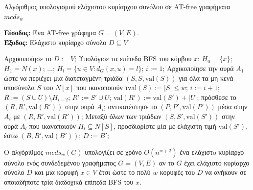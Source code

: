 \begin{algorithm}[H]
	\caption{Αλγόριθμος υπολογισμού ελάχιστου κυρίαρχου συνόλου σε AT-free γραφήματα $mcds_w$}
	\label{alg:domi-set}
	\hspace*{\algorithmicindent} \textbf{Είσοδος:} Ένα AT-free γράφημα $G = (V,E)$.\\
	\hspace*{\algorithmicindent} \textbf{Έξοδος:} Ελάχιστο κυρίαρχο σύνολο $D \subseteq V$
	
	\begin{algorithmic}[1]	
		\STATE Αρχικοποίησε το $D := V$;
		\STATE Υπολόγισε τα επίπεδα BFS του κόμβου $x$:
		\STATE $H_0 = \{x\}$; $H_1 = N(x)$; $\ldots$; $H_l = \{u \in V : d_G(x, u) = l\}$;
		\STATE $i := 1$;
		\STATE Αρχικοποίησε την ουρά $A_1$ ώστε να περιέχει μια διατεταγμένη τριάδα $(S, S, \text{val}(S))$ για όλα τα μη κενά υποσύνολα $S$ του $N[x]$ που ικανοποιούν τ$\text{val}(S) := |S| \leq w$;
		\STATE $i := i + 1$;
		\STATE $R := (S \cup U) \setminus H_{i-2}$;
		\STATE $R' := S' \cup U$;
		\STATE $\text{val}(R') := \text{val}(S') + |U|$;
		\STATE πρόσθεσε το $(R, R', \text{val}(R'))$ στην ουρά $A_i$;
		\ENDIF
		\STATE αντικατέστησε το $(P, P', \text{val}(P'))$ μέσα στην $A_i$ με $(R, R', \text{val}(R'))$;
		\ENDIF
		\ENDIF
		\ENDFOR
		\ENDFOR
		\ENDWHILE
		\STATE Μεταξύ όλων των τριάδων $(S, S', \text{val}(S'))$ στην ουρά $A_l$ που ικανοποιούν $H_l \subseteq N[S]$, προσδιορίστε μία με ελάχιστη τιμή $\text{val}(S')$, έστω $(B, B', \text{val}(B'))$;
		\STATE $D := B'$;
		\ENDIF
		\ENDFOR
	\end{algorithmic}
	
\end{algorithm}

\begin{theorem}
	Ο αλγόριθμος $mcds_w(G)$ υπολογίζει σε χρόνο $O(n^{w+2})$ ένα ελάχιστo κυρίαρχο σύνολο ενός συνδεδεμένου γραφήματος $G= (V,E)$ αν το $G$ έχει ελάχιστο 
	κυρίαρχο σύνολο $D$ και μια κορυφή $x\in V$ έτσι ώστε το πολύ $w$ κορυφές του $D$ να ανήκουν
	σε οποιαδήποτε τρία διαδοχικά επίπεδα BFS του $x$.
\end{theorem}

